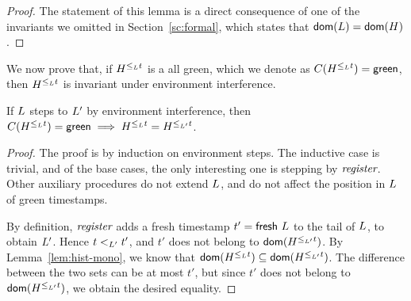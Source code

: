 \begin{proof}
The statement of this lemma is a direct consequence of one of the
invariants we omitted in Section~\ref{sc:formal}, which states that $
\dom{\ordlist} = \dom{\hist}$.
\end{proof}

We now prove that, if $\chaintleq{t}{\ordlist}$ is a {\sf all green},
which we denote as $\C(\chaintleq{t}{\ordlist}) = {\sf green}$, then
$\chaintleq{t}{\ordlist}$ is invariant under environment interference.


\begin{lemma}%
\label{lem:green-stable}%
If $\ordlist$ steps to $\ordlist'$ by environment interference, then
$\C(\chaintleq{t}{\ordlist}) = {\sf green} \implies
\chaintleq{t}{\ordlist} = \chaintleq{t}{\ordlist'}$.
\end{lemma}
%
\begin{proof}
The proof is by induction on environment steps. The inductive case is
trivial, and of the base cases, the only interesting one is stepping
by $\aux{register}$. Other auxiliary procedures do not extend
$\ordlist$, and do not affect the position in $\ordlist$ of green
timestamps.

By definition, $\aux{register}$ adds a fresh timestamp $t' =
\mathsf{fresh}\ \ordlist$ to the tail of $\ordlist$, to obtain
$\ordlist'$. Hence $t \tleP t'$, and $t'$ does not belong to
$\dom{\chaintleq{t}{\ordlist'}}$. By Lemma~\ref{lem:hist-mono}, we
know that $\dom{\chaintleq{t}{\ordlist}} \subseteq
\dom{\chaintleq{t}{\ordlist'}}$. The difference between the two sets
can be at most $t'$, but since $t'$ does not belong to
$\dom{\chaintleq{t}{\ordlist'}}$, we obtain the desired equality.
\end{proof}




